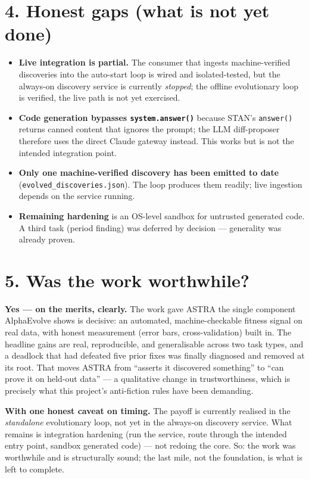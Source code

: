 \documentclass[11pt]{article}
\begin{document}
\section*{4. Honest gaps (what is not yet done)}
\begin{itemize}\setlength\itemsep{0.1em}
\item \textbf{Live integration is partial.} The consumer that ingests
machine-verified discoveries into the auto-start loop is wired and
isolated-tested, but the always-on discovery service is currently \emph{stopped};
the offline evolutionary loop is verified, the live path is not yet exercised.
\item \textbf{Code generation bypasses \texttt{system.answer()}} because STAN's
\texttt{answer()} returns canned content that ignores the prompt; the LLM
diff-proposer therefore uses the direct Claude gateway instead. This works but is
not the intended integration point.
\item \textbf{Only one machine-verified discovery has been emitted to date}
(\texttt{evolved\_discoveries.json}). The loop produces them readily; live
ingestion depends on the service running.
\item \textbf{Remaining hardening} is an OS-level sandbox for untrusted generated
code. A third task (period finding) was deferred by decision --- generality was
already proven.
\end{itemize}

\section*{5. Was the work worthwhile?}
\textbf{Yes --- on the merits, clearly.} The work gave ASTRA the single
component AlphaEvolve shows is decisive: an automated, machine-checkable fitness
signal on real data, with honest measurement (error bars, cross-validation)
built in. The headline gains are real, reproducible, and generalisable across two
task types, and a deadlock that had defeated five prior fixes was finally
diagnosed and removed at its root. That moves ASTRA from ``asserts it discovered
something'' to ``can prove it on held-out data'' --- a qualitative change in
trustworthiness, which is precisely what this project's anti-fiction rules have
been demanding.

\textbf{With one honest caveat on timing.} The payoff is currently realised in
the \emph{standalone} evolutionary loop, not yet in the always-on discovery
service. What remains is integration hardening (run the service, route through
the intended entry point, sandbox generated code) --- not redoing the core. So:
the work was worthwhile and is structurally sound; the last mile, not the
foundation, is what is left to complete.
\end{document}
